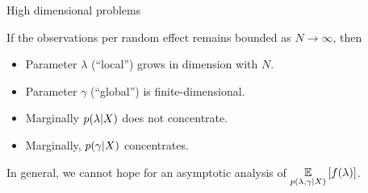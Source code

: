 
\begin{frame}{High dimensional problems}

    \pause
    
    If the observations per random effect remains bounded as $N \rightarrow
    \infty$, then
    \begin{itemize}
    \item Parameter $\lambda$ (``local'') grows in dimension with $N$.
    \item Parameter $\gamma$ (``global'') is finite-dimensional.
    \item Marginally $p(\lambda \vert X)$ does not concentrate.
    \item Marginally, $p(\gamma \vert X)$ concentrates.
    \end{itemize}
    
\spskip
\pause

In general, we cannot hope for an asymptotic analysis of
$\underset{p(\lambda, \gamma \vert X)}{\mathbb{E}}\left[f(\lambda)\right]$.

\spskip
\pause
{}

%
\end{frame}





